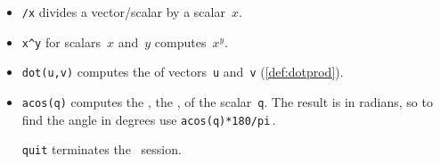 \begin{itemize}
\itemlo The  \(\uv\cdot(\vv\times\wv)\) (\cref{def:sctrpr}) is the volume of the parallelepiped with edges~\uv, \vv, and~\wv.





\subsubsection{Use \script\ for vector computation}

\itemhi \verb|[ ... ]| forms vectors: use \(n\)~numbers separated by semicolons for vectors in~\(\RR^n\) (or use newlines instead of the semicolons).  

\itemhi \verb|=| assigns the result of the expression to the right of the~\verb|=| to the variable name on the left.

\itemme \verb|norm(v)| computes the \slash {} of the vector~\verb|v| (\cref{def:veclen}).

\itemme \verb|+,-,*| is vector\slash scalar addition, subtraction, and multiplication.
Parentheses \verb|()| control the order of operations.

\item \verb|/x| divides a vector\slash scalar by a scalar~\(x\).

\item \verb|x^y| for scalars~\(x\) and~\(y\) computes~\(x^y\).

\item \verb|dot(u,v)| computes the  of vectors~\verb|u| and~\verb|v| (\cref{def:dotprod}).

\item \verb|acos(q)| computes the , the , of the scalar~\verb|q|.  
The result is in radians, so to find the angle in degrees use \verb|acos(q)*180/pi|\,.

\itemhi \verb|quit| terminates the \script\ session.





\end{itemize}


\makeanswers
